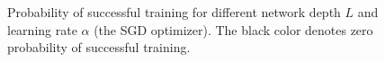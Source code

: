 \begin{figure}
\caption[Probability of successful training for the SGD optimizer.]
{Probability of successful training for different network depth $L$ and learning rate $\alpha$ (the SGD optimizer). The black color denotes zero probability of successful training.
}
\label{fig:mnist_sim}
\end{figure}
